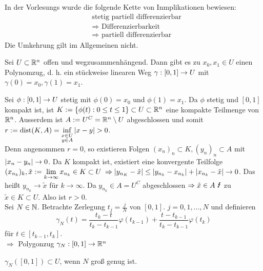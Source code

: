 \documentclass[../ana2.tex]{subfiles}
\begin{document}
In der Vorlesungs wurde die folgende Kette von Inmplikationen bewiesen:
\begin{align*}
    &\text{stetig partiell differenzierbar} \\
    &\Rightarrow \text{ Differenzierbarkeit} \\
    &\Rightarrow \text{ partiell differenzierbar}
\end{align*}
Die Umkehrung gilt im Allgemeinen nicht.
\begin{lem}
    Sei \(U \subset \mathbb{R}^n \) offen und wegzusammenhängend. 
    Dann gibt es zu \(x_0, x_1 \in U\) einen Polynomzug, d. h. 
    ein stückweise linearen Weg \(\gamma:[0,1]\rightarrow U\) mit
    \(\gamma(0) = x_0, \gamma(1) = x_1\).
\end{lem}
\begin{bew}
    Sei \(\phi:[0,1]\rightarrow U\) stetig mit \(\phi(0) = x_0\)
    und \(\phi(1) = x_1\). Da \(\phi\) stetig und \([0,1]\)
    kompakt ist, ist \( K:= \{\phi(t): 0 \leq t \leq 1\} \subset U \subset \mathbb{R}^n \)
    eine kompakte Teilmenge von \(\mathbb{R}^n\). Ausserdem ist 
    \(A := U^C = \mathbb{R}^n \setminus U\) abgeschlossen und somit 
    \(r := \operatorname{dist}(K, A) = 
    \underset{\substack{x \in U \\ y \in A}}{\inf} 
    \left|x-y\right| > 0\). \\
    Denn angenommen \( r = 0 \), so existieren 
    Folgen \( (x_n)_n \subset K, (y_n)_n \subset A \)
    mit \( \left|x_n - y_n\right| \rightarrow 0 \).
    Da \(K\) kompakt ist, existiert eine konvergente Teilfolge
    \( (x_{n_k})_k, \tilde{x} := \lim\limits_{k\rightarrow\infty} x_{n_k} \in K \subset U \)    
    \( \Rightarrow \left| y_{n_K} - \tilde{x} \right|
    \leq \left| y_{n_k} - x_{n_k} \right| 
    + \left| x_{n_k} - \tilde{x} \right| \rightarrow 0 \).
    Das heißt \( y_{n_k} \rightarrow \tilde{x} \) 
    für \(k \rightarrow \infty \). Da 
    \( y_{n_k} \in A = U^C \) abgeschlossen
    \( \Rightarrow \tilde{x} \in A \text{ \Lightning} \) 
    zu \(\tilde{x} \in K \subset U\). 
    Also ist \(r > 0\).\\
    Sei \( N\in\mathbb{N} \). Betrachte Zerlegung
    \( t_j = \frac{j}{N} \) von \( [0,1] \).
    \( j = 0,1,\ldots,N \) und definieren
    \[ \gamma_N(t) = \frac{t_k -t}{t_k-t_{k-1}} \varphi(t_{k-1}) 
    + \frac{t-t_{k-1}}{t_k - t_{k-1}} \varphi(t_k) \]
    für \( t \in [t_{k-1}, t_k] \).\\
    \(\Rightarrow\) Polygonzug \(\gamma_N:[0,1]\rightarrow \mathbb{R}^n\)
    \begin{beh}
        \( \gamma_N([0,1]) \subset U \), 
        wenn \(N\) groß genug ist.
    \end{beh}

\end{bew}
\end{document}
